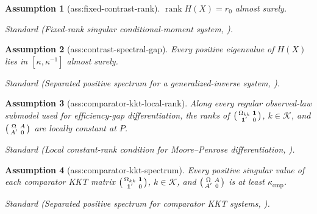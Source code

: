 \documentclass{article}
\newtheorem{assumption}{Assumption}
\begin{document}
\begin{assumption}[ass:fixed-contrast-rank]\label{ass:fixed-contrast-rank}
\(\operatorname{rank}H(X)=r_0\) almost surely.
\par\smallskip\noindent\emph{Standard} (Fixed-rank singular conditional-moment system, \cite{Newey2001}).
\end{assumption}

\begin{assumption}[ass:contrast-spectral-gap]\label{ass:contrast-spectral-gap}
Every positive eigenvalue of \(H(X)\) lies in \([\kappa,\kappa^{-1}]\) almost surely.
\par\smallskip\noindent\emph{Standard} (Separated positive spectrum for a generalized-inverse system, \cite{Newey2001}).
\end{assumption}

\begin{assumption}[ass:comparator-kkt-local-rank]\label{ass:comparator-kkt-local-rank}
Along every regular observed-law submodel used for efficiency-gap differentiation, the ranks of \(\begin{psmallmatrix}\Omega_{kk}&\mathbf 1\\\mathbf 1^{\prime}&0\end{psmallmatrix}\), \(k\in\mathcal K\), and \(\begin{psmallmatrix}\Omega&A\\A^{\prime}&0\end{psmallmatrix}\) are locally constant at \(P\).
\par\smallskip\noindent\emph{Standard} (Local constant-rank condition for Moore--Penrose differentiation, \cite{Newey2001}).
\end{assumption}

\begin{assumption}[ass:comparator-kkt-spectrum]\label{ass:comparator-kkt-spectrum}
Every positive singular value of each comparator KKT matrix \(\begin{psmallmatrix}\Omega_{kk}&\mathbf 1\\\mathbf 1^{\prime}&0\end{psmallmatrix}\), \(k\in\mathcal K\), and \(\begin{psmallmatrix}\Omega&A\\A^{\prime}&0\end{psmallmatrix}\) is at least \(\kappa_{\mathrm{cmp}}\).
\par\smallskip\noindent\emph{Standard} (Separated positive spectrum for comparator KKT systems, \cite{Newey2001}).
\end{assumption}
\end{document}
